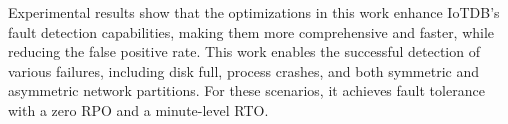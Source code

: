 \begin{abstract*}
Experimental results show that the optimizations in this work enhance IoTDB's fault detection capabilities, making them more comprehensive and faster, while reducing the false positive rate. This work enables the successful detection of various failures, including disk full, process crashes, and both symmetric and asymmetric network partitions. For these scenarios, it achieves fault tolerance with a zero RPO and a minute-level RTO. 

\end{abstract*}
